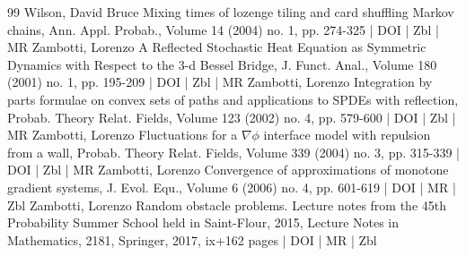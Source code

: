 \documentclass[10pt]{amsart}
\theoremstyle{definition}\newtheorem{defi}[theo]{Definition}\newtheorem{rema}[theo]{Remark}\newtheorem{exam}[theo]{Example}\newtheorem{exem}[theo]{Example}\newtheorem{nota}[theo]{Notation}
\theoremstyle{plain}
\begin{document}
\begin{thebibliography}{99}
 Wilson, David Bruce Mixing times of lozenge tiling and card shuffling Markov chains, Ann. Appl. Probab., Volume 14 (2004) no. 1, pp. 274-325 | DOI | Zbl | MR
 Zambotti, Lorenzo A Reflected Stochastic Heat Equation as Symmetric Dynamics with Respect to the 3-d Bessel Bridge, J. Funct. Anal., Volume 180 (2001) no. 1, pp. 195-209 | DOI | Zbl | MR
 Zambotti, Lorenzo Integration by parts formulae on convex sets of paths and applications to SPDEs with reflection, Probab. Theory Relat. Fields, Volume 123 (2002) no. 4, pp. 579-600 | DOI | Zbl | MR
 Zambotti, Lorenzo Fluctuations for a $\nabla \phi $ interface model with repulsion from a wall, Probab. Theory Relat. Fields, Volume 339 (2004) no. 3, pp. 315-339 | DOI | Zbl | MR
 Zambotti, Lorenzo Convergence of approximations of monotone gradient systems, J. Evol. Equ., Volume 6 (2006) no. 4, pp. 601-619 | DOI | MR | Zbl
 Zambotti, Lorenzo Random obstacle problems. Lecture notes from the 45th Probability Summer School held in Saint-Flour, 2015, Lecture Notes in Mathematics, 2181, Springer, 2017, ix+162 pages | DOI | MR | Zbl
\end{thebibliography}
\end{document}

